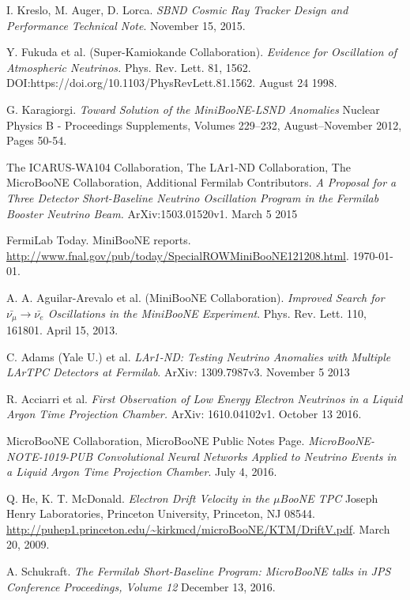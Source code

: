 \documentclass[a4paper]{article}\linespread{1.4}
\begin{document}
\begin{thebibliography}{9}

I. Kreslo, M. Auger, D. Lorca.
\textit{SBND Cosmic Ray Tracker Design and Performance Technical Note}. 
November 15, 2015.

Y. Fukuda et al. (Super-Kamiokande Collaboration).
\textit{Evidence for Oscillation of Atmospheric Neutrinos.}
Phys. Rev. Lett. 81, 1562. DOI:https://doi.org/10.1103/PhysRevLett.81.1562.
August 24 1998.

G. Karagiorgi.
\textit{Toward Solution of the MiniBooNE-LSND Anomalies} 
Nuclear Physics B - Proceedings Supplements, Volumes 229–232, August–November 2012, Pages 50-54.

The ICARUS-WA104 Collaboration, The LAr1-ND Collaboration, The MicroBooNE Collaboration, Additional Fermilab Contributors.
\textit{A Proposal for a Three Detector Short-Baseline Neutrino Oscillation Program in the Fermilab Booster Neutrino Beam.}
ArXiv:1503.01520v1.
March 5 2015

FermiLab Today. MiniBooNE reports.
\url{http://www.fnal.gov/pub/today/SpecialROWMiniBooNE121208.html}. 
\today.

A. A. Aguilar-Arevalo et al. (MiniBooNE Collaboration).
\textit{Improved Search for $\bar{\nu_{\mu}} \to \bar{\nu_{e}}$ Oscillations in the MiniBooNE Experiment}.
Phys. Rev. Lett. 110, 161801. April 15, 2013.

C. Adams (Yale U.) et al.
\textit{LAr1-ND: Testing Neutrino Anomalies with Multiple LArTPC Detectors at Fermilab}.
ArXiv: 1309.7987v3. 
November 5 2013

R. Acciarri et al.
\textit{First Observation of Low Energy Electron Neutrinos in a Liquid Argon Time Projection Chamber.}
ArXiv: 1610.04102v1.
October 13 2016.
 
MicroBooNE Collaboration, MicroBooNE Public Notes Page.
\textit{MicroBooNE-NOTE-1019-PUB Convolutional Neural Networks Applied to Neutrino Events in a Liquid Argon Time Projection Chamber}.
July 4, 2016.

Q. He, K. T. McDonald. 
\textit{Electron Drift Velocity in the $\mu$BooNE TPC}
Joseph Henry Laboratories, Princeton University, Princeton, NJ 08544.
\url{http://puhep1.princeton.edu/~kirkmcd/microBooNE/KTM/DriftV.pdf}.
March 20, 2009.

A. Schukraft.  
\textit{The Fermilab Short-Baseline Program: MicroBooNE talks in JPS Conference Proceedings, Volume 12} December 13, 2016.


\end{thebibliography}
\end{document}
